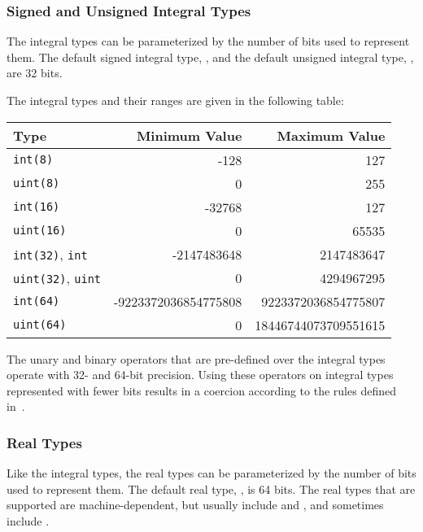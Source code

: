 \subsubsection{Signed and Unsigned Integral Types}
\label{Signed_and_Unsigned_Integral_Types}

The integral types can be parameterized by the number of bits used to
represent them.  The default signed integral type, , and the
default unsigned integral type, , are 32 bits.

The integral types and their ranges are given in the following table:

\begin{center}
\begin{tabular}{|l|r|r|}
\hline
{\bf Type} & {\bf Minimum Value} & {\bf Maximum Value} \\
\hline
{\tt int(8)} & -128 & 127 \\
{\tt uint(8)} & 0 & 255 \\
{\tt int(16)} & -32768 & 127 \\
{\tt uint(16)} & 0 & 65535 \\
{\tt int(32)}, {\tt int} & -2147483648 & 2147483647 \\
{\tt uint(32)}, {\tt uint} & 0 & 4294967295 \\
{\tt int(64)} & -9223372036854775808 & 9223372036854775807 \\
{\tt uint(64)} & 0 & 18446744073709551615 \\
\hline
\end{tabular}
\end{center}

The unary and binary operators that are pre-defined over the integral
types operate with 32- and 64-bit precision.  Using these operators on
integral types represented with fewer bits results in a coercion
according to the rules defined in~.

\subsubsection{Real Types}
\label{Real_Types}

Like the integral types, the real types can be parameterized by the
number of bits used to represent them.  The default real
type, , is 64 bits.  The real types that are supported are
machine-dependent, but usually include 
and , and sometimes include .

